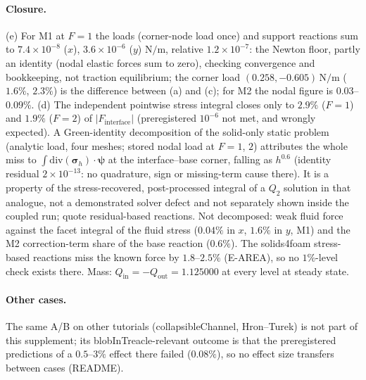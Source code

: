 \documentclass[sn-mathphys,Numbered]{sn-jnl}
\begin{document}
\paragraph{Closure.}
(e) For M1 at $F=1$ the loads (corner-node load once) and support reactions sum to $7.4\times10^{-8}$ ($x$), $3.6\times10^{-6}$ ($y$) $\mathrm{N/m}$, relative $1.2\times10^{-7}$: the Newton floor, partly an identity (nodal elastic forces sum to zero), checking convergence and bookkeeping, not traction equilibrium; the corner load $(0.258,-0.605)\,\mathrm{N/m}$ ($1.6\%$, $2.3\%$) is the difference between (a) and (c); for M2 the nodal figure is $0.03$--$0.09\%$.
(d) The independent pointwise stress integral closes only to $2.9\%$ ($F=1$) and $1.9\%$ ($F=2$) of $|F_\mathrm{interface}|$ (preregistered $10^{-6}$ not met, and wrongly expected). A Green-identity decomposition of the solid-only static problem (analytic load, four meshes; stored nodal load at $F=1$, $2$) attributes the whole miss to $\int\mathrm{div}(\bm\sigma_h)\cdot\bm\psi$ at the interface--base corner, falling as $h^{0.6}$ (identity residual $2\times10^{-13}$: no quadrature, sign or missing-term cause there). It is a property of the stress-recovered, post-processed integral of a $Q_2$ solution in that analogue, not a demonstrated solver defect and not separately shown inside the coupled run; quote residual-based reactions. Not decomposed: weak fluid force against the facet integral of the fluid stress ($0.04\%$ in $x$, $1.6\%$ in $y$, M1) and the M2 correction-term share of the base reaction ($0.6\%$).
The solids4foam stress-based reactions miss the known force by $1.8$--$2.5\%$ (E-AREA), so no $1\%$-level check exists there. Mass: $Q_\mathrm{in}=-Q_\mathrm{out}=1.125000$ at every level at steady state.

\paragraph{Other cases.} The same A/B on other tutorials (collapsibleChannel, Hron--Turek) is not part of this supplement; its blobInTreacle-relevant outcome is that the preregistered predictions of a $0.5$--$3\%$ effect there failed ($0.08\%$), so no effect size transfers between cases (README).
\end{document}
